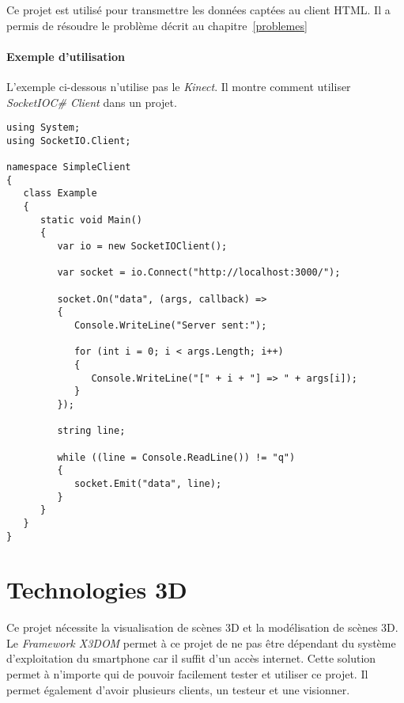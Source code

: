 Ce projet est utilisé pour transmettre les données captées au client HTML. Il a permis de résoudre le problème décrit au chapitre~\ref{problemes}

\paragraph{Exemple d'utilisation \\ }
L'exemple ci-dessous n'utilise pas le \textit{Kinect}. Il montre comment utiliser \textit{SocketIOC\# Client} dans un projet.


\begin{lstlisting}
using System;
using SocketIO.Client;

namespace SimpleClient
{   
   class Example
   {
      static void Main()
      {
         var io = new SocketIOClient();

         var socket = io.Connect("http://localhost:3000/");

         socket.On("data", (args, callback) =>
         {
            Console.WriteLine("Server sent:");

            for (int i = 0; i < args.Length; i++)
            {
               Console.WriteLine("[" + i + "] => " + args[i]);
            }
         });

         string line;

         while ((line = Console.ReadLine()) != "q")
         {
            socket.Emit("data", line);
         }
      }
   }
}
\end{lstlisting}



\pagebreak
\section{Technologies 3D}  \label{technologies}
Ce projet nécessite la visualisation de scènes 3D et la modélisation de scènes 3D. Le \textit{Framework X3DOM} permet à ce projet de ne pas être dépendant du système d'exploitation du \textsf{smartphone} car il suffit d'un accès internet. Cette solution permet à n'importe qui de pouvoir facilement tester et utiliser ce projet. Il permet également d'avoir plusieurs clients, un testeur et une visionner. \\ 

